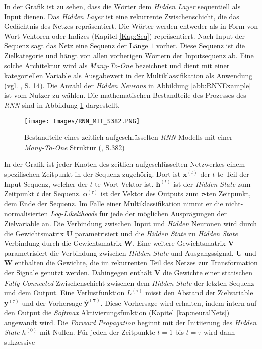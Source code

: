 \documentclass[a4paper,11pt]{article}
\begin{document}
In der Grafik ist zu sehen, dass die Wörter dem \textit{Hidden Layer} sequentiell als Input dienen. Das \textit{Hidden Layer} ist eine rekurrente Zwischenschicht, die das Gedächtnis des Netzes repräsentiert. Die Wörter werden entweder als in Form von Wort-Vektoren oder Indizes (Kapitel \ref{Kap:Seq}) repräsentiert. Nach Input der Sequenz sagt das Netz eine Sequenz der Länge $1$ vorher. Diese Sequenz ist die Zielkategorie und hängt von allen vorherigen Wörtern der Inputsequenz ab. 
Eine solche Architektur wird als \textit{Many-To-One}
bezeichnet und dient mit einer kategoriellen Variable als Ausgabewert in der Multiklassifikation als Anwendung (vgl. \cite{deepEssentials}, S. 14). Die Anzahl der \textit{Hidden Neurons} in Abbildung \ref{abb:RNNExample} ist vom Nutzer zu wählen. Die mathematischen Bestandteile des Prozesses des \textit{RNN} sind in Abbildung \ref{abb:RNNArch} dargestellt.

\begin{figure}[!ht]
\begin{center}
\texttt{[image: Images/RNN\_MIT\_S382.PNG]}
\caption{Bestandteile eines zeitlich aufgeschlüsselten \textit{RNN} Modells mit einer \textit{Many-To-One} Struktur (\cite{deepL}, S.382)}
\label{abb:RNNArch}
\end{center}
\end{figure}

In der Grafik ist jeder Knoten des zeitlich aufgeschlüsselten Netzwerkes einem spezifischen Zeitpunkt in der Sequenz zugehörig.
Dort ist $\bm{x}^{(t)}$ der $t$-te Teil der Input Sequenz, welcher der $t$-te Wort-Vektor ist. $\bm{h}^{(t)}$ ist der \textit{Hidden State} zum Zeitpunkt $t$ der Sequenz. $\bm{o}^{(\tau)}$ ist der Vektor des Outputs zum $\tau$-ten Zeitpunkt, dem Ende der Sequenz. Im Falle einer Multiklassifikation nimmt er die nicht-normalisierten \textit{Log-Likelihoods} für jede der möglichen Ausprägungen der Zielvariable an.
Die Verbindung zwischen Input und \textit{Hidden} Neuronen wird durch die Gewichtsmatrix $\bm{U}$ parametrisiert und die \textit{Hidden State} zu \textit{Hidden State} Verbindung durch die Gewichtsmatrix $\bm{W}$. Eine weitere Gewichtsmatrix $\bm{V}$ parametrisiert die Verbindung zwischen \textit{Hidden State} und Ausgangssignal. $\bm{U}$ und $\bm{W}$ enthalten die Gewichte, die im rekurrenten Teil des Netzes zur Transformation der Signale genutzt werden. Dahingegen enthält $\bm{V}$ die Gewichte einer statischen \textit{Fully Connected} Zwischenschicht zwischen dem \textit{Hidden State} der letzten Sequenz und dem Output.
Eine Verlustfunktion $L^{(\tau)}$ misst den Abstand der Zielvariable $\bm{y}^{(\tau)}$ und der Vorhersage $\bm{\hat{y}^{(\tau)}}$. Diese Vorhersage wird erhalten, indem intern auf den Output die \textit{Softmax} Aktivierungsfunktion (Kapitel \ref{kap:neuralNets}) angewandt wird. Die \textit{Forward Propagation} beginnt mit der Initiierung des \textit{Hidden State} $h^{(0)}$ mit Nullen. Für jeden der Zeitpunkte $t=1$ bis $t = \tau$ wird dann sukzessive 
\end{document}
